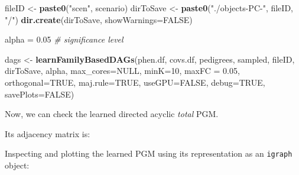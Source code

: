 \documentclass[]{article}
\newenvironment{Shaded}{\begin{snugshade}}{\end{snugshade}}
\newcommand{\KeywordTok}[1]{\textcolor[rgb]{0.13,0.29,0.53}{\textbf{#1}}}
\newcommand{\DataTypeTok}[1]{\textcolor[rgb]{0.13,0.29,0.53}{#1}}
\newcommand{\DecValTok}[1]{\textcolor[rgb]{0.00,0.00,0.81}{#1}}
\newcommand{\FloatTok}[1]{\textcolor[rgb]{0.00,0.00,0.81}{#1}}
\newcommand{\StringTok}[1]{\textcolor[rgb]{0.31,0.60,0.02}{#1}}
\newcommand{\CommentTok}[1]{\textcolor[rgb]{0.56,0.35,0.01}{\textit{#1}}}
\newcommand{\OtherTok}[1]{\textcolor[rgb]{0.56,0.35,0.01}{#1}}
\newcommand{\OperatorTok}[1]{\textcolor[rgb]{0.81,0.36,0.00}{\textbf{#1}}}
\newcommand{\NormalTok}[1]{#1}
\begin{document}
\begin{Shaded}
\begin{Highlighting}[]
\NormalTok{fileID <-}\StringTok{ }\KeywordTok{paste0}\NormalTok{(}\StringTok{"scen"}\NormalTok{, scenario)}
\NormalTok{dirToSave <-}\StringTok{ }\KeywordTok{paste0}\NormalTok{(}\StringTok{"./objects-PC-"}\NormalTok{, fileID, }\StringTok{"/"}\NormalTok{)}
\KeywordTok{dir.create}\NormalTok{(dirToSave, }\DataTypeTok{showWarnings=}\OtherTok{FALSE}\NormalTok{)}

\NormalTok{alpha =}\StringTok{ }\FloatTok{0.05} \CommentTok{# significance level}

\NormalTok{dags <-}\StringTok{ }\KeywordTok{learnFamilyBasedDAGs}\NormalTok{(phen.df, covs.df, pedigrees, sampled,}
\NormalTok{   fileID, dirToSave, alpha, }\DataTypeTok{max_cores=}\OtherTok{NULL}\NormalTok{,}
   \DataTypeTok{minK=}\DecValTok{10}\NormalTok{, }\DataTypeTok{maxFC =} \FloatTok{0.05}\NormalTok{, }\DataTypeTok{orthogonal=}\OtherTok{TRUE}\NormalTok{, }\DataTypeTok{maj.rule=}\OtherTok{TRUE}\NormalTok{,}
   \DataTypeTok{useGPU=}\OtherTok{FALSE}\NormalTok{, }\DataTypeTok{debug=}\OtherTok{TRUE}\NormalTok{, }\DataTypeTok{savePlots=}\OtherTok{FALSE}\NormalTok{)}
\end{Highlighting}
\end{Shaded}

Now, we can check the learned directed acyclic \emph{total} PGM.

Its adjacency matrix is:

\begin{Shaded}
\end{Shaded}

Inspecting and plotting the learned PGM using its representation as an
\texttt{igraph} object:
\end{document}
